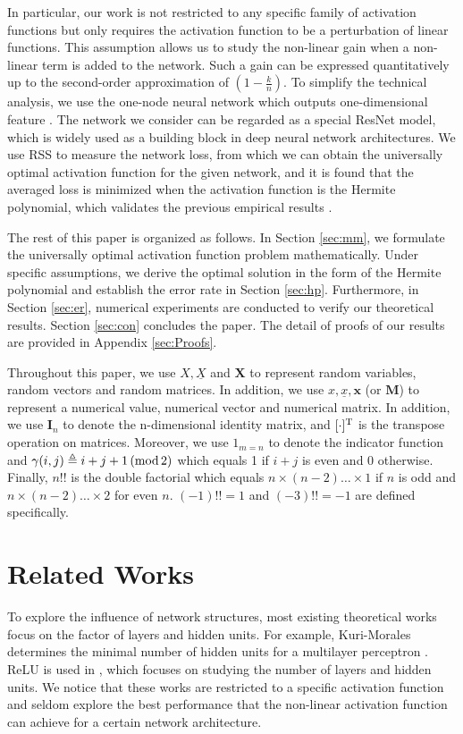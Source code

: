 \documentclass[appliedmath,article,accept,pdftex,moreauthors]{Definitions/mdpi}
\begin{document}
In particular, our work is not restricted to any specific family of activation
functions but only requires the activation function to be 
a perturbation of linear functions.
This assumption allows us to study the non-linear gain when
a non-linear term is added to the network.
Such a gain can be expressed quantitatively up to
the second-order approximation of $(1-\frac{k}{n})$.
To simplify the technical analysis,
we use the one-node neural network which outputs one-dimensional feature \cite{dey2018approximation}. The network we consider can be regarded as a special ResNet model,
which is widely used as a building block in deep neural network architectures.
We use RSS to measure the network loss,
from which we can obtain the universally optimal activation function for the given network,
and it is found that the averaged loss is minimized when the activation function is
the Hermite polynomial, which
validates the previous empirical results \cite{ma2005constructive}.

The rest of this paper is organized as follows. In Section \ref{sec:mm}, we formulate the universally optimal activation function problem
mathematically.
Under specific assumptions, we derive the optimal solution in the form of
the Hermite polynomial and establish
the error rate in Section \ref{sec:hp}.
Furthermore, in Section \ref{sec:er}, numerical experiments are conducted to verify our theoretical results.
Section \ref{sec:con} concludes the paper. The detail of proofs of our results are provided in Appendix \ref{sec:Proofs}.

Throughout this paper,
we use $X,\underline{X}$ and $\bm{X} $ %
 to represent random variables,
random vectors and
random matrices. In addition,
we use
$x, \underline{x}, \bm{x}$ (or $\mathbf{M}$) to represent a numerical value,
numerical vector
and numerical matrix.
In addition, we use $\mathbf{I}_n$ to denote the n-dimensional identity matrix, and
$[\cdot]^{\mathrm{T}}$ is the transpose operation on matrices.
Moreover, we use $\mathrm{1}_{m=n}$ to denote the indicator function
and $\gamma(i,j) \triangleq i+j+1\, (\mathrm{mod} \, 2)$
which equals 1 if $ i + j$ is even and 0 otherwise. Finally,
$n!!$ is the double factorial which equals $n \times (n-2) \dots \times1$ if $n$ is odd and $n \times (n-2)\dots \times 2$ for even $n$. $(-1)!!=1$
and $(-3)!!=-1$
are defined specifically.


\section{Related Works}
To explore the influence of network structures, most existing theoretical works focus on
the factor of layers and hidden units.
For example, Kuri-Morales determines the minimal number of hidden units for a multilayer perceptron \cite{kuri2017closed}.
ReLU is used in \cite{AroraBMM18}, which focuses on studying the number of layers and hidden units.
We notice that these works are restricted to a specific activation function and seldom explore 
the best performance that the non-linear activation function can achieve for a certain network architecture.
\end{document}
